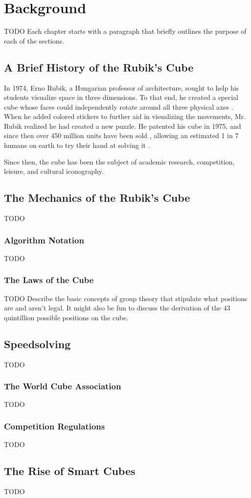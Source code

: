 
\chapter{Background} %

\label{Chapter2} %

TODO Each chapter starts with a paragraph that briefly outlines the purpose of each of the sections.


\section{A Brief History of the Rubik's Cube}

In 1974, Erno Rubik, a Hungarian professor of architecture, sought to help his students visualize space in three dimensions. To that end, he created a special cube whose faces could independently rotate around all three physical axes \cite{rubik-motivation}. When he added colored stickers to further aid in visualizing the movements, Mr. Rubik realized he had created a new puzzle. He patented his cube in 1975, \cite{rubik-patent} and since then over 450 million units have been sold \cite{forbes-rubik-merger}, allowing an estimated 1 in 7 humans on earth to try their hand at solving it \cite{rubik-population-reached}.

Since then, the cube has been the subject of academic research, competition, leisure, and cultural iconography.


\section{The Mechanics of the Rubik's Cube}

TODO

\subsection{Algorithm Notation}
TODO

\subsection{The Laws of the Cube}
TODO Describe the basic concepts of group theory that stipulate what positions are and aren't legal. It might also be fun to discuss the derivation of the 43 quintillion possible positions on the cube.


\section{Speedsolving}

TODO

\subsection{The World Cube Association}
TODO

\subsection{Competition Regulations}
TODO


\section{The Rise of Smart Cubes}

TODO